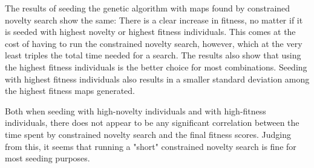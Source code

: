 \begin{table}[!h]
	\begin{center}
	\renewcommand{\arraystretch}{1}
	\caption{Results of the standard genetic algorithm seeded with highest novelty novel individuals.}
	\label{tab:results_novelevolutionhighnovelty}
	\end{center}
\end{table}

The results of seeding the genetic algorithm with maps found by constrained novelty search show the same: There is a clear increase in fitness, no matter if it is seeded with highest novelty or highest fitness individuals. This comes at the cost of having to run the constrained novelty search, however, which at the very least triples the total time needed for a search. The results also show that using the highest fitness individuals is the better choice for most combinations. Seeding with highest fitness individuals also results in a smaller standard deviation among the highest fitness maps generated.

Both when seeding with high-novelty individuals and with high-fitness individuals, there does not appear to be any significant correlation between the time spent by constrained novelty search and the final fitness scores. Judging from this, it seems that running a "short" constrained novelty search is fine for most seeding purposes.

